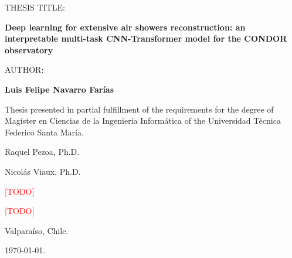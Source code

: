 \thispagestyle{empty}
{\setlength{\parindent}{0cm}
    {\normalsize \uppercase{Thesis Title}: \par}
    \vspace{.5cm}
    {\normalsize \bfseries Deep learning for extensive air showers reconstruction: an interpretable multi-task
    CNN-Transformer model for the CONDOR observatory \par}
    \vspace{2cm}
    {\normalsize \uppercase{Author:} \par}
    \vspace{.5cm}
    {\normalsize\bfseries Luis Felipe Navarro Farías \par}
    \vspace{2cm}
    {\normalsize Thesis presented in partial fulfillment of the requirements for the degree of Magíster en Ciencias de la Ingeniería Informática  of the Universidad Técnica Federico Santa María.\par}
    \vspace{2cm}
    {\normalsize Raquel Pezoa, Ph.D. \hfill \raisebox{-\baselineskip}{\shortstack{\underline{\hspace{10cm}}\\Advisor}} \par}
    \vspace{1cm}
    {\normalsize Nicolás Viaux, Ph.D. \hfill {} \par}
    \vspace{1cm}
    {\normalsize \textcolor{red}{[TODO]} \hfill \raisebox{-\baselineskip}{\shortstack{\underline{\hspace{10cm}}\\~}} \par}
    \vspace{1cm}
    {\normalsize \textcolor{red}{[TODO]} \hfill \raisebox{-\baselineskip}{\shortstack{\underline{\hspace{10cm}}\\~}} \par}
    
    
    \vfill
    
    \raggedleft
    {\small Valparaíso, Chile. \par}
    {\small \today. \par}
}
